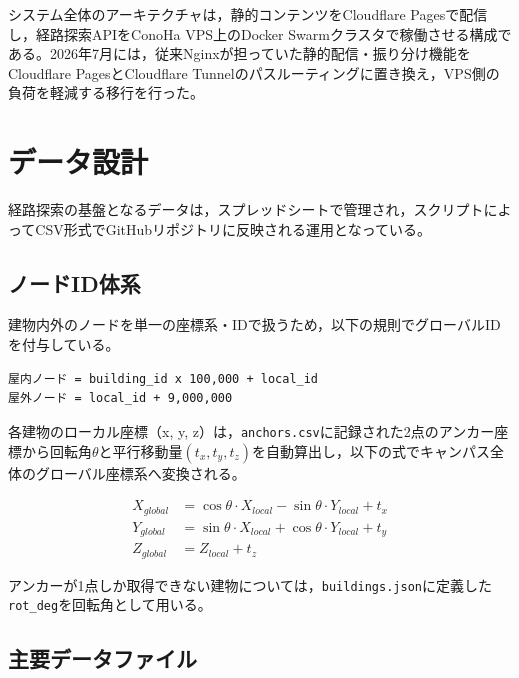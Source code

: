 \documentclass[a4paper,10.5pt]{ltjsarticle}
\begin{document}
システム全体のアーキテクチャは，静的コンテンツをCloudflare Pagesで配信し，経路探索APIをConoHa VPS上のDocker Swarmクラスタで稼働させる構成である。2026年7月には，従来Nginxが担っていた静的配信・振り分け機能をCloudflare PagesとCloudflare Tunnelのパスルーティングに置き換え，VPS側の負荷を軽減する移行を行った。

\section{データ設計}
\label{sec:data}

経路探索の基盤となるデータは，スプレッドシートで管理され，スクリプトによってCSV形式でGitHubリポジトリに反映される運用となっている。

\subsection{ノードID体系}

建物内外のノードを単一の座標系・IDで扱うため，以下の規則でグローバルIDを付与している。

\begin{lstlisting}
屋内ノード = building_id x 100,000 + local_id
屋外ノード = local_id + 9,000,000
\end{lstlisting}

各建物のローカル座標（x, y, z）は，\texttt{anchors.csv}に記録された2点のアンカー座標から回転角$\theta$と平行移動量$(t_x, t_y, t_z)$を自動算出し，以下の式でキャンパス全体のグローバル座標系へ変換される。

\begin{align}
X_{global} &= \cos\theta \cdot X_{local} - \sin\theta \cdot Y_{local} + t_x \\
Y_{global} &= \sin\theta \cdot X_{local} + \cos\theta \cdot Y_{local} + t_y \\
Z_{global} &= Z_{local} + t_z
\end{align}

アンカーが1点しか取得できない建物については，\texttt{buildings.json}に定義した\texttt{rot\_deg}を回転角として用いる。

\subsection{主要データファイル}
\end{document}
